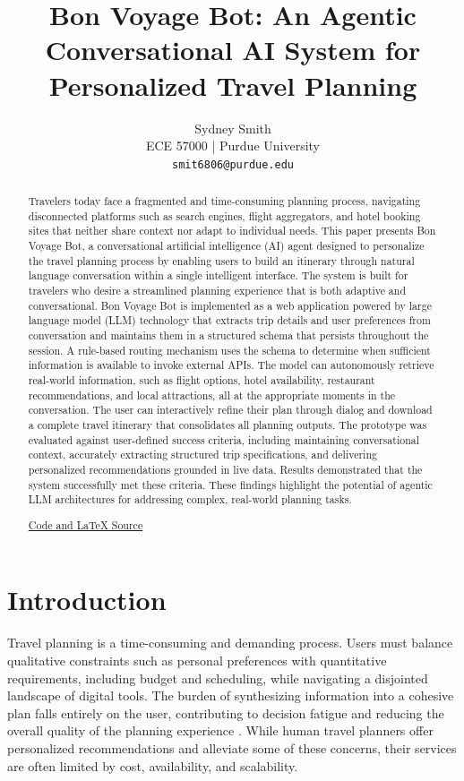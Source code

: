 \documentclass{article}
\title{Bon Voyage Bot: An Agentic Conversational AI System for Personalized Travel Planning}
\author{Sydney Smith  \\
ECE 57000 | Purdue University\\
\texttt{smit6806@purdue.edu} \\
}
\begin{document}
\maketitle

\begin{abstract}
Travelers today face a fragmented and time-consuming planning process, navigating disconnected platforms such as search engines, flight aggregators, and hotel booking sites that neither share context nor adapt to individual needs. This paper presents Bon Voyage Bot, a conversational artificial intelligence (AI) agent designed to personalize the travel planning process by enabling users to build an itinerary through natural language conversation within a single intelligent interface. The system is built for travelers who desire a streamlined planning experience that is both adaptive and conversational. Bon Voyage Bot is implemented as a web application powered by large language model (LLM) technology that extracts trip details and user preferences from conversation and maintains them in a structured schema that persists throughout the session. A rule-based routing mechanism uses the schema to determine when sufficient information is available to invoke external APIs. The model can autonomously retrieve real-world information, such as flight options, hotel availability, restaurant recommendations, and local attractions, all at the appropriate moments in the conversation. The user can interactively refine their plan through dialog and download a complete travel itinerary that consolidates all planning outputs. The prototype was evaluated against user-defined success criteria, including maintaining conversational context, accurately extracting structured trip specifications, and delivering personalized recommendations grounded in live data. Results demonstrated that the system successfully met these criteria. These findings highlight the potential of agentic LLM architectures for addressing complex, real-world planning tasks.
\begin{center}
    \href{https://github.com/smit6806/bon-voyage-bot}{Code and LaTeX Source}
\end{center}
\end{abstract}

\section{Introduction}
Travel planning is a time-consuming and demanding process. Users must balance qualitative constraints such as personal preferences with quantitative requirements, including budget and scheduling, while navigating a disjointed landscape of digital tools. The burden of synthesizing information into a cohesive plan falls entirely on the user, contributing to decision fatigue and reducing the overall quality of the planning experience \citep{greenwood2020}. While human travel planners offer personalized recommendations and alleviate some of these concerns, their services are often limited by cost, availability, and scalability. 
\end{document}
